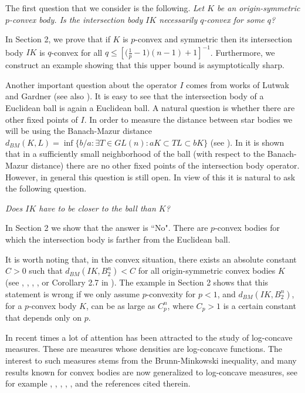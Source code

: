\documentclass[12pt]{amsart} %
\renewcommand{\[}{\left[}
\renewcommand{\(}{\left(}
\renewcommand{\]}{\right]}
\renewcommand{\)}{\right)}
\renewcommand{\le}{\leqslant}
\begin{document}
The first question that we consider is the following.
 {\it Let $K$ be an origin-symmetric $p$-convex body. Is the intersection body $IK$   necessarily $q$-convex for some $q$?
 }

In Section 2, we prove that if $K$ is $p$-convex and symmetric then its intersection body $IK$ is $q$-convex for all  $q \le \left[
\big(\frac 1p-1\big)(n-1) + 1 \right]^{-1}$. Furthermore, we construct an example showing that this upper bound   is asymptotically sharp.


Another important question about the operator $I$ comes from works of  Lutwak \cite{Lu2} and Gardner \cite[Prob. 8.6, 8.7]{Ga2} (see also \cite{GrZ}). It is easy to see that the intersection body of a Euclidean ball is again a Euclidean ball. A natural question is whether there are other fixed points of $I$. In order to measure the distance between star  bodies  we will be using the Banach-Mazur distance
$d_{BM}(K,L)=\inf \{b/a: \exists T \in GL(n): aK \subset TL \subset bK \}$ (see \cite{MS}).
In \cite{FNRZ} it is shown that in a sufficiently small neighborhood of the ball (with respect to the Banach-Mazur distance) there are no other fixed points of the  intersection body operator. However, in general this question is still open.
In view of this it is natural to ask   the following question.


{\it Does $IK$ have to be closer to the ball than $K$?  }



In Section 2 we show that the answer is ``No". There are $p$-convex bodies for which the intersection body is farther from the Euclidean ball.


It is worth noting that, in the convex situation,  there exists an absolute constant $C>0$ such that
$d_{BM}(IK,B_2^n)<C$ for all origin-symmetric convex bodies $K$  (see \cite{He}, \cite{Ba1},  \cite{Ba2}, \cite{Bou}, \cite{MP} or Corollary 2.7 in \cite{Ko}). The example in Section 2 shows that this statement is wrong if we only assume $p$-convexity for $p<1$, and  $d_{BM}(IK,B_2^n)$, for a $p$-convex body $K$, can be as large as   $C_p^n$, where $C_p>1$ is a certain constant that depends only on $p$.



In recent times a lot of attention has been attracted to the study of log-concave measures. These are measures whose densities are log-concave functions. The interest to such measures stems from the Brunn-Minkowski inequality, and many results known for convex bodies are now generalized to log-concave measures,  see for example \cite{Ba1}, \cite{Ba2},  \cite{AKM}, \cite{KlM}, \cite{FM}, \cite{Pa} and the references cited therein.
\end{document}
